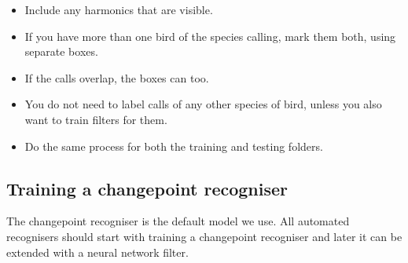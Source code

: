 \documentclass{article}
\begin{document}
\begin{description}
\begin{itemize}
\item Include any harmonics that are visible. 
\item If you have more than one bird of the species calling, mark them both, using separate boxes. 
\item If the calls overlap, the boxes can too. 
\item You do not need to label calls of any other species of bird, unless you also want to train filters for them. 
\item Do the same process for both the training and testing folders.
\end{itemize}
\end{description}

\subsection{Training a changepoint recogniser}
The changepoint recogniser is the default model we use. All automated recognisers should start with training a changepoint recogniser and later it can be extended with a neural network filter.
\end{document}
